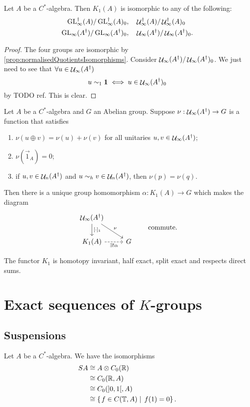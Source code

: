 \begin{proposition}
Let $A$ be a $C^*$-algebra. Then $K_1(A)$ is isomorphic to any of the following:
\begin{align*}
\operatorname{GL}_\infty^\dagger(A) / \operatorname{GL}_\infty^\dagger(A)_0,& & &\mathop{\mathcal{U}}\nolimits_\infty^\dagger(A) / \mathop{\mathcal{U}}\nolimits_\infty^\dagger(A)_0 \\
\operatorname{GL}_\infty(A^\dagger) / \operatorname{GL}_\infty(A^\dagger)_0,& & &\mathop{\mathcal{U}}\nolimits_\infty(A^\dagger) / \mathop{\mathcal{U}}\nolimits_\infty(A^\dagger)_0.
\end{align*}
\end{proposition}
\begin{proof}
The four groups are isomorphic by \ref{prop:normalisedQuotientsIsomorphisms}. Consider $\mathop{\mathcal{U}}\nolimits_\infty(A^\dagger) / \mathop{\mathcal{U}}\nolimits_\infty(A^\dagger)_0$. We just need to see that $\forall u\in \mathop{\mathcal{U}}\nolimits_\infty(A^\dagger)$
\[ u\sim_1 \bm{\mathrm{1}} \iff u \in \mathop{\mathcal{U}}\nolimits_\infty(A^\dagger)_0\]
by TODO ref. This is clear.
\end{proof}

\begin{proposition} \label{prop:univeralPropertyK1}
Let $A$ be a $C^*$-algebra and $G$ an Abelian group. Suppose $\nu:\mathop{\mathcal{U}}\nolimits_\infty(A^\dagger)\to G$ is a function that satisfies
\begin{enumerate}
\item $\nu(u\oplus v) = \nu(u)+\nu(v)$ for all unitaries $u,v\in\mathop{\mathcal{U}}\nolimits_\infty(A^\dagger)$;
\item $\nu(\vec{1}_A) = 0$;
\item if $u,v\in\mathop{\mathcal{U}}\nolimits_n(A^\dagger)$ and $u\sim_h v \in \mathop{\mathcal{U}}\nolimits_n(A^\dagger)$, then $\nu(p) = \nu(q)$.
\end{enumerate}
Then there is a unique group homomorphism $\alpha: K_{1}(A) \to G$ which makes the diagram
\[ \begin{tikzcd}
\Unitaries_\infty(A^\dagger) \ar[d,"{[\cdot]_1}"] \ar[dr, "\nu"] & \\
K_{1}(A) \ar[r, dashed, swap, "\exists! \alpha"] & G
\end{tikzcd} \qquad \text{commute.}\]
\end{proposition}

The functor $K_1$ is homotopy invariant, half exact, split exact and respects direct sums.

\section{Exact sequences of $K$-groups}
\subsection{Suspensions}
\begin{lemma}
Let $A$ be a $C^*$-algebra. We have the isomorphisms
\begin{align*}
SA &\cong A\otimes C_0(\mathbb{R}) \\ &\cong C_0(\mathbb{R}, A) \\ &\cong C_0(]0,1[, A) \\ &\cong \left\{\left. f\in C(\mathbb{T}, A) \;\right|\; f(1)=0 \right\}.
\end{align*}
\end{lemma}

